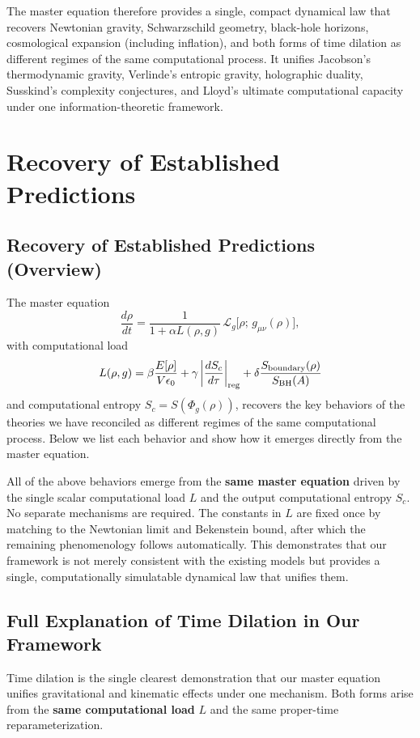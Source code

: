 \documentclass[reprint,amsmath,amssymb,aps,prd,preprintnumbers,superscriptaddress,longbibliography,10pt]{revtex4-2}
\begin{document}
The master equation therefore provides a single, compact dynamical law that recovers Newtonian gravity, Schwarzschild geometry, black-hole horizons, cosmological expansion (including inflation), and both forms of time dilation as different regimes of the same computational process. It unifies Jacobson’s thermodynamic gravity, Verlinde’s entropic gravity, holographic duality, Susskind’s complexity conjectures, and Lloyd’s ultimate computational capacity under one information-theoretic framework.

\section{Recovery of Established Predictions}

\subsection{Recovery of Established Predictions (Overview)}
The master equation
\[
\frac{d\rho}{dt} = \frac{1}{1 + \alpha L(\rho,g)} \,\mathcal{L}_g\bigl[\rho;\, g_{\mu\nu}(\rho)\bigr],
\]
with computational load
\[
L(\rho,g) = \beta \frac{E[\rho]}{V \epsilon_0} + \gamma \left| \frac{d S_c}{d\tau} \right|_{\rm reg} + \delta \frac{S_{\rm boundary}(\rho)}{S_{\rm BH}(A)}
\]
and computational entropy \(S_c = S(\Phi_g(\rho))\), recovers the key behaviors of the theories we have reconciled as different regimes of the same computational process. Below we list each behavior and show how it emerges directly from the master equation.

All of the above behaviors emerge from the \textbf{same master equation} driven by the single scalar computational load \(L\) and the output computational entropy \(S_c\). No separate mechanisms are required. The constants in \(L\) are fixed once by matching to the Newtonian limit and Bekenstein bound, after which the remaining phenomenology follows automatically. This demonstrates that our framework is not merely consistent with the existing models but provides a single, computationally simulatable dynamical law that unifies them.

\subsection{Full Explanation of Time Dilation in Our Framework}
Time dilation is the single clearest demonstration that our master equation unifies gravitational and kinematic effects under one mechanism. Both forms arise from the \textbf{same computational load} \(L\) and the same proper-time reparameterization.
\end{document}
